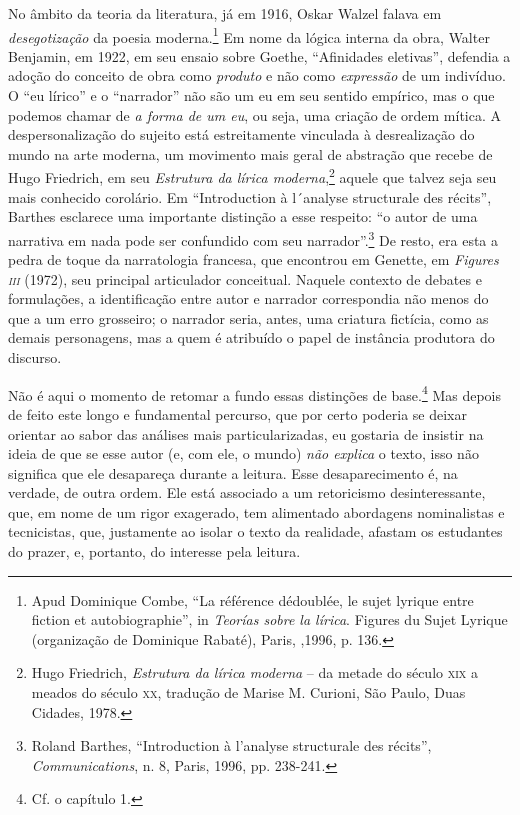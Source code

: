 No âmbito da teoria da literatura, já em 1916, Oskar Walzel falava em
\emph{desegotização} da poesia moderna.\footnote{Apud Dominique Combe,
  ``La référence dédoublée, le sujet lyrique entre fiction et
  autobiographie'', in \emph{Teorías sobre la lírica}. Figures du Sujet
  Lyrique (organização de Dominique Rabaté), Paris, ,1996, p. 136.}
Em nome da lógica interna da obra, Walter Benjamin, em 1922, em seu
ensaio sobre Goethe, ``Afinidades eletivas'', defendia a adoção do
conceito de obra como \emph{produto} e não como \emph{expressão} de um
indivíduo. O ``eu lírico'' e o ``narrador'' não são um eu em seu sentido
empírico, mas o que podemos chamar de \emph{a forma de um eu}, ou seja,
uma criação de ordem mítica. A despersonalização do sujeito está
estreitamente vinculada à desrealização do mundo na arte moderna, um
movimento mais geral de abstração que recebe de Hugo Friedrich, em seu
\emph{Estrutura da lírica moderna},\footnote{Hugo Friedrich,
  \emph{Estrutura da lírica moderna} -- da metade do século \textsc{xix}
  a meados do século \textsc{xx}, tradução de Marise M. Curioni, São
  Paulo, Duas Cidades, 1978.} aquele que talvez seja seu mais conhecido
corolário. Em ``Introduction à l´analyse structurale des récits'',
Barthes esclarece uma importante distinção a esse respeito: ``o autor de
uma narrativa em nada pode ser confundido com seu narrador''.\footnote{Roland
  Barthes, ``Introduction à l'analyse structurale des récits'',
  \emph{Communications}, n. 8, Paris, 1996, pp. 238-241.} De resto, era
esta a pedra de toque da narratologia francesa, que encontrou em
Genette, em \emph{Figures \textsc{iii}} (1972), seu principal
articulador conceitual. Naquele contexto de debates e formulações, a
identificação entre autor e narrador correspondia não menos do que a um
erro grosseiro; o narrador seria, antes, uma criatura fictícia, como as
demais personagens, mas a quem é atribuído o papel de instância
produtora do discurso.

Não é aqui o momento de retomar a fundo essas distinções de
base.\footnote{Cf. o capítulo 1.} Mas depois de feito este longo e
fundamental percurso, que por certo poderia se deixar orientar ao sabor
das análises mais particularizadas, eu gostaria de insistir na ideia de
que se esse autor (e, com ele, o mundo) \emph{não explica} o texto, isso
não significa que ele desapareça durante a leitura. Esse desaparecimento
é, na verdade, de outra ordem. Ele está associado a um retoricismo
desinteressante, que, em nome de um rigor exagerado, tem alimentado
abordagens nominalistas e tecnicistas, que, justamente ao isolar o texto
da realidade, afastam os estudantes do prazer, e, portanto, do interesse
pela leitura.

